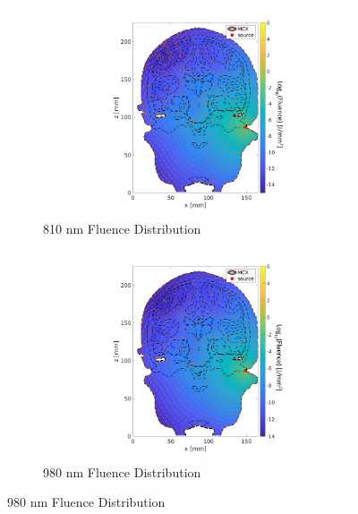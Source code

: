 \documentclass[journal,twoside,web]{ieeecolor}
\begin{document}
\begin{figure}[hbt!]
    \begin{subfigure}{.475\linewidth}
      \includegraphics[width=\linewidth]{Figures/Fluence_Distribution_810nm_Cochlear.png}
      \caption{810 nm Fluence Distribution}
      \label{MLEDdet}
    \end{subfigure}
    \hfill
    \begin{subfigure}{.5\linewidth}
      \includegraphics[width=\linewidth]{Figures/Fluence_Distribution_980nm_Cochlear.png}
      \caption{980 nm Fluence Distribution}
      \label{energydetPSK}
    \end{subfigure}
    

\end{figure}
\end{document}
